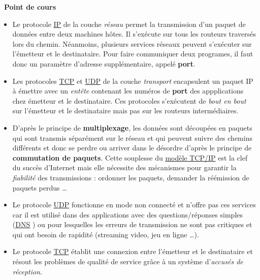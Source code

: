 \documentclass[
  11pt,
]{article}
\newcounter{cours}
\newenvironment{cours}[1]
{\par \medskip   \addtocounter{cours}{1} \noindent  
\begin{bclogo}[arrondi =0.1,  ombre = true, barre=none, logo=\bcbook, marge=4]{~\textbf{Point de cours} \textbf{\thecours} {\itshape #1} }  \par}
{
\end{bclogo}
 \par \bigskip }
\newcounter{prog}
\begin{document}
\begin{cours}{}

\begin{itemize}
\item
  Le protocole
  \href{https://fr.wikipedia.org/wiki/Internet_Protocol}{IP} de la
  couche \emph{réseau} permet la transmission d'un paquet de données
  entre deux machines hôtes. Il s'exécute sur tous les routeurs
  traversés lors du chemin. Néanmoins, plusieurs services réseaux
  peuvent s'exécuter sur l'émetteur et le destinataire. Pour faire
  communiquer deux programes, il faut donc un paramètre d'adresse
  supplémentaire, appelé \textbf{port}.
\item
  Les protocoles
  \href{https://fr.wikipedia.org/wiki/Transmission_Control_Protocol}{TCP}
  et \href{https://fr.wikipedia.org/wiki/User_Datagram_Protocol}{UDP} de
  la couche \emph{transport} encapsulent un paquet IP à émettre avec un
  \emph{entête} contenant les numéros de \textbf{port} des appplications
  chez émetteur et le destinataire. Ces protocoles s'exécutent de
  \emph{bout en bout} sur l'émetteur et le destinataire mais pas sur les
  routeurs intermédiaires.
\item
  D'après le principe de \textbf{multiplexage}, les données sont
  découpées en paquets qui sont transmis séparément sur le réseau et qui
  peuvent suivre des chemins différents et donc se perdre ou arriver
  dans le désordre d'après le principe de \textbf{commutation de
  paquets}. Cette souplesse du
  \href{https://fr.wikipedia.org/wiki/Suite_des_protocoles_Internet}{modèle
  TCP/IP} est la clef du succès d'Internet mais elle nécessite des
  mécanismes pour garantir la \emph{fiabilité} des transmissions :
  ordonner les paquets, demander la réémission de paquets perdus
  \ldots{}
\item
  Le protocole
  \href{https://fr.wikipedia.org/wiki/User_Datagram_Protocol}{UDP}
  fonctionne en mode non connecté et n'offre pas ces services car il est
  utilisé dans des applications avec des questions/réponses simples
  (\href{https://fr.wikipedia.org/wiki/Domain_Name_System}{DNS} ) ou
  pour lesquelles les erreurs de transmission ne sont pas critiques et
  qui ont besoin de rapidité (streaming video, jeu en ligne \ldots).
\item
  Le protocole
  \href{https://fr.wikipedia.org/wiki/Transmission_Control_Protocol}{TCP}
  établit une connexion entre l'émetteur et le destinataire et résout
  les problèmes de qualité de service grâce à un système d'\emph{accusés
  de réception}.
\end{itemize}

\end{cours}
\end{document}
